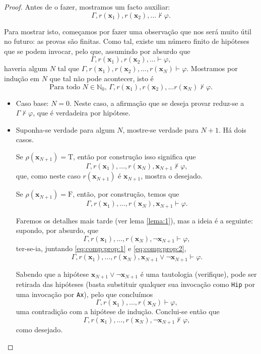 \documentclass{report}
\theoremstyle{definition}
\theoremstyle{remark}
\newcommand{\N}{\mathbb{N}}
\renewcommand{\bf}[1]{\mathbf{#1}}
\newcommand{\lt}{\mathrm{T}}
\newcommand{\lf}{\mathrm{F}}
\begin{document}
\begin{proof}
	Antes de o fazer, mostramos um facto auxiliar:
	\begin{equation}\label{eq:comp:prop:-1}
	\Gamma, r(\bf x_1), r(\bf x_2), \dots \nvdash \varphi.
	\end{equation}
	
	Para mostrar isto, começamos por fazer uma observação que nos será muito útil no futuro: as provas são finitas. Como tal, existe um número finito de hipóteses que se podem invocar, pelo que, assumindo por absurdo que
	\[\Gamma, r(\bf x_1), r(\bf x_2), \dots \vdash \varphi,\]
	haveria algum $N$ tal que $\Gamma, r(\bf x_1), r(\bf x_2), \dots, r(\bf x_N) \vdash \varphi$. Mostramos por indução em $N$ que tal não pode acontecer, isto é
	\begin{equation}\label{eq:comp:prop:0}
	\text{Para todo $N \in \N_0$, } \Gamma, r(\bf x_1), r(\bf x_2), \dots r(\bf x_N) \nvdash \varphi.
	\end{equation}
	
	\begin{itemize}
	\item Caso base: $N = 0$. Neste caso, a afirmação que se deseja provar reduz-se a $\Gamma \nvdash \varphi$, que é verdadeira por hipótese.
	
	\item Suponha-se verdade para algum $N$, mostre-se verdade para $N+1$. Há dois casos.
	
	Se $\rho(\bf x_{N+1}) = \lt$, então por construção isso significa que
	\[\Gamma, r(\bf x_1), \dots, r(\bf x_N), \bf x_{N+1} \nvdash \varphi,\]
	que, como neste caso $r(\bf x_{N+1})$ é $\bf x_{N+1}$, mostra o desejado.
	
	Se $\rho(\bf x_{N+1}) = \lf$, então, por construção, temos que
	\begin{equation}\label{eq:comp:prop:1}
	\Gamma, r(\bf x_1), \dots, r(\bf x_N), \bf x_{N+1} \vdash \varphi.
	\end{equation}
	
	Faremos os detalhes mais tarde (ver lema \ref{lema:1}), mas a ideia é a seguinte: supondo, por absurdo, que
	\begin{equation}\label{eq:comp:prop:2}
	\Gamma, r(\bf x_1), \dots, r(\bf x_N), \neg \bf x_{N+1} \vdash \varphi,
	\end{equation}
	ter-se-ia, juntando \eqref{eq:comp:prop:1} e \eqref{eq:comp:prop:2},
	\[\Gamma, r(\bf x_1), \dots, r(\bf x_N), \bf x_{N+1} \lor \neg \bf x_{N+1} \vdash \varphi.\]
	
	Sabendo que a hipótese $\bf x_{N+1} \lor \neg \bf x_{N+1}$ é uma tautologia (verifique), pode ser retirada das hipóteses (basta substituir qualquer sua invocação como \texttt{Hip} por uma invocação por \texttt{Ax}), pelo que concluímos
	\[\Gamma, r(\bf x_1), \dots, r(\bf x_N) \vdash \varphi,\]
	uma contradição com a hipótese de indução. Conclui-se então que
	\[\Gamma, r(\bf x_1), \dots, r(\bf x_N), \neg \bf x_{N+1} \nvdash \varphi,\]
	como desejado.
	\end{itemize}
	

\end{proof}
\end{document}
